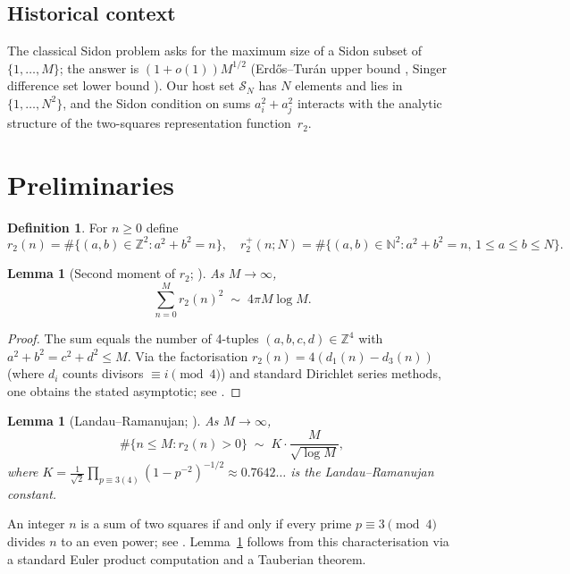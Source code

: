 \documentclass[12pt]{article}
\newtheorem{lemma}[theorem]{Lemma}
\theoremstyle{definition}
\newtheorem{definition}[theorem]{Definition}
\newcommand{\Z}{\mathbb{Z}}
\newcommand{\SN}{\mathcal{S}_N}
\begin{document}
\subsection{Historical context}

The classical Sidon problem asks for the maximum size of a Sidon subset
of $\{1,\ldots,M\}$; the answer is $(1+o(1))M^{1/2}$ (Erd\H{o}s--Tur\'an
upper bound \cite{ET41}, Singer difference set lower bound \cite{Sin38}).
Our host set $\SN$ has $N$ elements and lies in $\{1,\ldots,N^2\}$, and the
Sidon condition on sums $a_i^2+a_j^2$ interacts with the analytic structure
of the two-squares representation function~$r_2$.

\section{Preliminaries}

\begin{definition}
For $n \ge 0$ define
\[
  r_2(n) = \#\{(a,b)\in\Z^2 : a^2+b^2=n\}, \quad
  r_2^+(n;N) = \#\{(a,b)\in\mathbb{N}^2 : a^2+b^2=n,\,1\le a\le b\le N\}.
\]
\end{definition}

\begin{lemma}[Second moment of $r_2$; {\cite[Ch.~18]{HW08}}]\label{lem:r2-second}
As $M\to\infty$,
\[
  \sum_{n=0}^{M} r_2(n)^2 \;\sim\; 4\pi M \log M.
\]
\end{lemma}

\begin{proof}
The sum equals the number of 4-tuples $(a,b,c,d)\in\Z^4$ with
$a^2+b^2=c^2+d^2\le M$.  Via the factorisation $r_2(n)=4(d_1(n)-d_3(n))$
(where $d_i$ counts divisors $\equiv i\pmod{4}$) and standard Dirichlet
series methods, one obtains the stated asymptotic; see \cite[Theorem~339]{HW08}.
\end{proof}

\begin{lemma}[Landau--Ramanujan; {\cite{Land08}}]\label{lem:LR}
As $M\to\infty$,
\[
  \#\{n \le M : r_2(n) > 0\} \;\sim\; K \cdot \frac{M}{\sqrt{\log M}},
\]
where $K = \frac{1}{\sqrt{2}}\prod_{p \equiv 3(4)}(1-p^{-2})^{-1/2}
\approx 0.7642\ldots$ is the Landau--Ramanujan constant.
\end{lemma}

An integer $n$ is a sum of two squares if and only if every prime
$p \equiv 3\pmod{4}$ divides $n$ to an even power; see \cite[Thm.~366]{HW08}.
Lemma~\ref{lem:LR} follows from this characterisation via a standard Euler
product computation and a Tauberian theorem.
\end{document}
